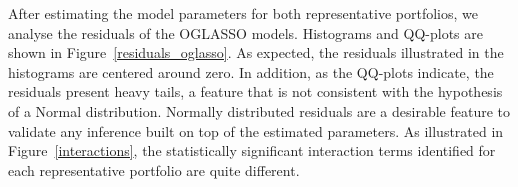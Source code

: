 After estimating the model parameters for both representative portfolios, we analyse the residuals of the OGLASSO models. Histograms and QQ-plots are shown in Figure~\ref{residuals_oglasso}. As expected, the residuals illustrated in the histograms are centered around zero. In addition, as the QQ-plots indicate, the residuals present heavy tails, a feature that is not consistent with the hypothesis of a Normal distribution. 
%
%
Normally distributed residuals are a desirable feature to validate any inference built on top of the estimated parameters. As illustrated in Figure~\ref{interactions}, the statistically significant interaction terms identified for each representative portfolio are quite different.


